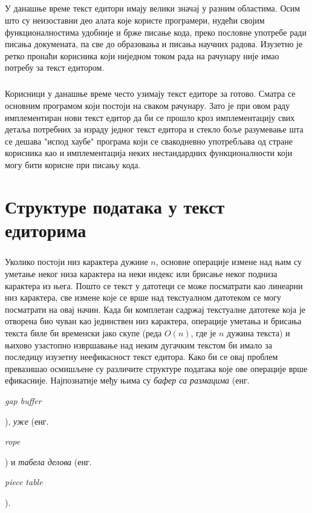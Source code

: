 \documentclass[12pt,oneside]{memoir}
\begin{document}
\paragraph{}
У данашње време текст едитори имају велики значај у разним областима.
Осим што су неизоставни део алата које користе програмери, нудећи својим
функционалностима удобније и брже писање кода, преко пословне употребе ради
писања докумената, па све до образовања и писања научних радова. Изузетно је ретко пронаћи корисника који ниједном током рада на рачунару није
имао потребу за текст едитором.

\paragraph{}
Корисници у данашње време често узимају текст едиторе за готово. Сматра се основним 
програмом који постоји на сваком рачунару. Зато је при овом раду имплементиран нови
текст едитор да би се прошло кроз имплементацију свих детаља потребних за израду 
једног текст едитора и стекло боље разумевање шта се дешава "испод хаубе" програма
који се свакодневно употребљава од стране корисника као и имплементација неких 
нестандардних функционалности који могу бити корисне при писању кода.

\chapter{Структуре података у текст едиторима}
\paragraph{}
Уколико постоји низ карактера дужине \(n\), основне операције измене над њим су 
уметање неког низа карактера на неки индекс или брисање неког подниза карактера из њега.
Пошто се текст у датотеци се може посматрати као линеарни низ карактера, све измене које
се врше над текстуалном датотеком се могу посматрати на овај начин. 
Када би комплетан садржај текстуалне датотеке која је отворена био чуван као јединствен
низ карактера, операције уметања и брисања текста биле би временски јако скупе (реда
\(O(n)\), где је \(n\) дужина текста) и њихово узастопно извршавање над неким дугачким
текстом би имало за последицу изузетну неефикасност текст едитора. Како би се овај 
проблем превазишао осмишљене су различите структуре података које ове операције
врше ефикасније. Најпознатије међу њима су \emph{бафер са размацима}
(енг. \begin{latinica}\textit{gap buffer}\end{latinica}), \emph{уже} (енг. 
\begin{latinica}\textit{rope}\end{latinica}) и \emph{табела делова} (енг. 
\begin{latinica}\textit{piece table}\end{latinica}).
\end{document}
